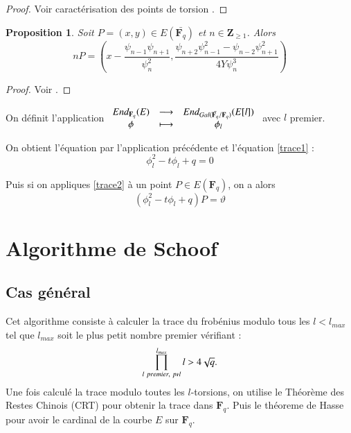 \documentclass{article}%
\theoremstyle{plain}
\theoremstyle{definition}
\theoremstyle{plain}
\newtheorem{proposition}{Proposition}[section]
\theoremstyle{plain}
\theoremstyle{remark}
\newcommand\fq{\mathbf{F}_{q}}
\begin{document}
\begin{proof}
Voir caractérisation des points de torsion \cite{ref4}. 
\end{proof}

\begin{proposition}
Soit $P=(x,y)\in E(\bar{\fq})$ et $n\in\mathbf{Z}_{\geq 1}$. Alors 
\begin{equation}
nP = \left(x - \dfrac{\psi_{n - 1}\psi_{n + 1}}{\psi_{n}^{2}},\dfrac{\psi_{n + 2}\psi_{n - 1}^{2} - \psi_{n - 2}\psi_{n + 1}^{2}}{4Y\psi_{n}^{3}}\right)
\label{np2}
\end{equation}
\end{proposition}

\begin{proof}
Voir \cite{ref6}.
\end{proof}
  
On définit l'application $
\begin{array}{cl cl}
End_{\fq}(E)&\longrightarrow&End_{Gal(\bar{\fq}/\fq)}(E[l])\\
\phi&\longmapsto&\phi_{l}
\end{array}
$ avec $l$ premier.

On obtient l'équation par l'application précédente et l'équation \eqref{trace1} :
\begin{equation}
\phi_{l}^{2} - t\phi_{l} + q = 0
\label{trace2}
\end{equation}

Puis si on appliques \eqref{trace2} à un point $P\in E(\fq)$, on a alors 
\begin{equation}
(\phi_{l}^{2} - t\phi_{l} + q)P = \vartheta
\label{trace3}
\end{equation}


\section{Algorithme de Schoof}
\subsection{Cas général}

Cet algorithme consiste à calculer la trace du frobénius modulo tous les $l<l_{max}$ tel que $l_{max}$ soit le plus petit nombre premier vérifiant :\begin{equation} 
\prod_{l\ premier,\ p\nshortmid l}^{l_{max}}l > 4\sqrt{q}.
\label{primorielle}
\end{equation}
Une fois calculé la trace modulo toutes les $l$-torsions, on utilise le Théorème des Restes Chinois (CRT) pour obtenir la trace dans $\fq$. Puis le théoreme de Hasse pour avoir le cardinal de la courbe $E$ sur $\fq$.
\end{document}
